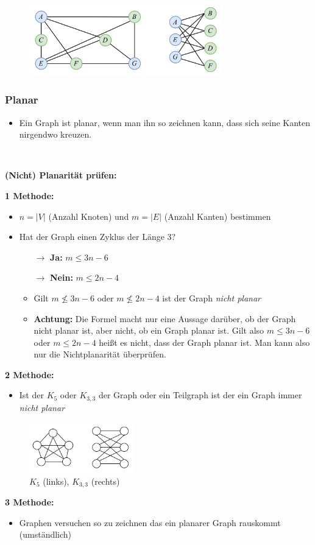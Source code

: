 \begin{figure}[h]
\centering
\includegraphics[width=0.75\textwidth]{graphics/graph_bipartit2.png}
\end{figure}

\subsubsection*{Planar}

\begin{itemize}
\item Ein Graph ist planar, wenn man ihn so zeichnen kann, dass sich seine Kanten nirgendwo kreuzen.
\end{itemize}\

\textbf{(Nicht) Planarität prüfen:}

\textbf{1 Methode:}

\begin{itemize}
\item $n = |V|$ (Anzahl Knoten) und $m = |E|$ (Anzahl Kanten) bestimmen
\item Hat der Graph einen Zyklus der Länge 3?
	\begin{itemize}
	\item[$\rightarrow$] \textbf{Ja:} $m \leq 3n - 6$
	\item[$\rightarrow$] \textbf{Nein:} $m \leq 2n - 4$
	\item Gilt $m \not \leq 3n - 6$ oder $m \not \leq 2n - 4$ ist der Graph \textit{nicht planar}
	\item \textbf{Achtung:} Die Formel macht nur eine Aussage darüber, ob der Graph nicht planar ist, aber nicht, ob ein Graph planar ist. Gilt also $m \leq 3n - 6$ oder $m \leq 2n - 4$ heißt es nicht, dass der Graph planar ist. Man kann also nur die Nichtplanarität überprüfen.
	\end{itemize}
\end{itemize}

\textbf{2 Methode:}

\begin{itemize}
\item Ist der $K_5$ oder $K_{3,3}$ der Graph oder ein Teilgraph ist der ein Graph immer \textit{nicht planar}
\end{itemize}

\begin{figure}[h]
\centering
\includegraphics[width=0.4\textwidth]{graphics/graph_planar.png}
\caption*{$K_5$ (links), $K_{3,3}$ (rechts)}
\end{figure}

\textbf{3 Methode:}

\begin{itemize}
\item Graphen versuchen so zu zeichnen das ein planarer Graph rauskommt (umständlich)
\end{itemize}